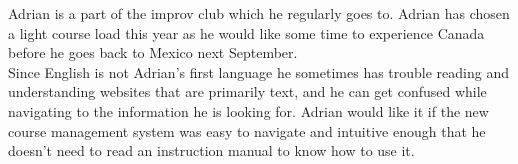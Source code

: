 \documentclass[10pt]{article}
\begin{document}
Adrian is a part of the improv club which he regularly goes to. Adrian has chosen a light course load this year as he would like some time to experience Canada before he goes back to Mexico next September.\\

Since English is not Adrian's first language he sometimes has trouble reading and understanding websites that are primarily text, and he can get confused while navigating to the information he is looking for. Adrian would like it if the new course management system was easy to navigate and intuitive enough that he doesn't need to read an instruction manual to know how to use it.
\end{document}
